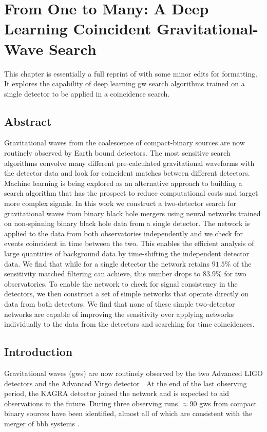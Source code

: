 \chapter{From One to Many: A Deep Learning Coincident Gravitational-Wave Search}\label{ch:cnn_coinc}
\minitoc
This chapter is essentially a full reprint of \cite{Schafer:2021cml} with some minor edits for formatting. It explores the capability of deep learning \acrshort{gw} search algorithms trained on a single detector to be applied in a coincidence search.

\setcounter{section}{-1}
\section{Abstract}
Gravitational waves from the coalescence of compact-binary sources are now routinely observed by Earth bound detectors. The most sensitive search algorithms convolve many different pre-calculated gravitational waveforms with the detector data and look for coincident matches between different detectors. Machine learning is being explored as an alternative approach to building a search algorithm that has the prospect to reduce computational costs and target more complex signals. In this work we construct a two-detector search for gravitational waves from binary black hole mergers using neural networks trained on non-spinning binary black hole data from a single detector. The network is applied to the data from both observatories independently and we check for events coincident in time between the two. This enables the efficient analysis of large quantities of background data by time-shifting the independent detector data. We find that while for a single detector the network retains $91.5\%$ of the sensitivity matched filtering can achieve, this number drops to $83.9\%$ for two observatories. To enable the network to check for signal consistency in the detectors, we then construct a set of simple networks that operate directly on data from both detectors. We find that none of these simple two-detector networks are capable of improving the sensitivity over applying networks individually to the data from the detectors and searching for time coincidences.

\section{Introduction}
Gravitational waves (\acrshort{gw}s) are now routinely observed by the two Advanced LIGO detectors \cite{LIGOScientific:2014pky} and the Advanced Virgo detector \cite{VIRGO:2014yos}. At the end of the last observing period, the KAGRA detector \cite{KAGRA:2018plz} joined the network and is expected to aid observations in the future. During three observing runs $\approx 90$ \acrshort{gw}s from compact binary sources have been identified, almost all of which are consistent with the merger of \acrfull{bbh} systems \cite{LIGOScientific:2018mvr, LIGOScientific:2020ibl, Nitz:2021uxj, LIGOScientific:2021qlt, LIGOScientific:2021djp, Nitz:2021zwj}.

